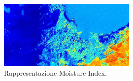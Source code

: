 \begin{itemize}
    \begin{figure}[H]
        \centering
        \includegraphics[width=0.6\textwidth]{Immagini/Satelliti/Sentinel-2-Moisture-Index-850x425.jpg}
        \caption{Rappresentazione Moisture Index.}
    \end{figure}

\end{itemize}
